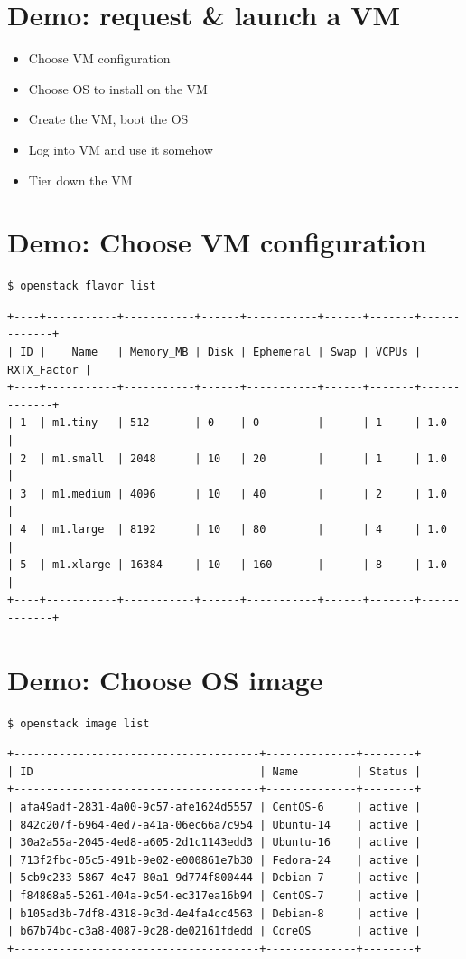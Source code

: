 \documentclass[11pt]{article}
\begin{document}
\section*{Demo: request \& launch a VM}
\label{sec:orgaea7818}
\begin{itemize}
\item Choose VM configuration
\item Choose OS to install on the VM
\item Create the VM, boot the OS
\item Log into VM and use it somehow
\item Tier down the VM
\end{itemize}

\section*{Demo: Choose VM configuration}
\label{sec:orgd013f89}
\begin{verbatim}
$ openstack flavor list
\end{verbatim}

\begin{verbatim}
+----+-----------+-----------+------+-----------+------+-------+-------------+
| ID |    Name   | Memory_MB | Disk | Ephemeral | Swap | VCPUs | RXTX_Factor |
+----+-----------+-----------+------+-----------+------+-------+-------------+
| 1  | m1.tiny   | 512       | 0    | 0         |      | 1     | 1.0         |
| 2  | m1.small  | 2048      | 10   | 20        |      | 1     | 1.0         |
| 3  | m1.medium | 4096      | 10   | 40        |      | 2     | 1.0         |
| 4  | m1.large  | 8192      | 10   | 80        |      | 4     | 1.0         |
| 5  | m1.xlarge | 16384     | 10   | 160       |      | 8     | 1.0         |
+----+-----------+-----------+------+-----------+------+-------+-------------+
\end{verbatim}

\section*{Demo: Choose OS image}
\label{sec:org0431733}
\begin{verbatim}
$ openstack image list
\end{verbatim}

\begin{verbatim}
+--------------------------------------+--------------+--------+
| ID                                   | Name         | Status |
+--------------------------------------+--------------+--------+
| afa49adf-2831-4a00-9c57-afe1624d5557 | CentOS-6     | active |
| 842c207f-6964-4ed7-a41a-06ec66a7c954 | Ubuntu-14    | active |
| 30a2a55a-2045-4ed8-a605-2d1c1143edd3 | Ubuntu-16    | active |
| 713f2fbc-05c5-491b-9e02-e000861e7b30 | Fedora-24    | active |
| 5cb9c233-5867-4e47-80a1-9d774f800444 | Debian-7     | active |
| f84868a5-5261-404a-9c54-ec317ea16b94 | CentOS-7     | active |
| b105ad3b-7df8-4318-9c3d-4e4fa4cc4563 | Debian-8     | active |
| b67b74bc-c3a8-4087-9c28-de02161fdedd | CoreOS       | active |
+--------------------------------------+--------------+--------+
\end{verbatim}
\end{document}
